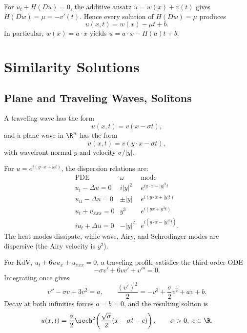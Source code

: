 \begin{example}
\label{ex:hamilton-jacobi-additive-separation}
For $u_t+H(Du)=0$, the additive ansatz $u=w(x)+v(t)$ gives
$H(Dw)=\mu=-v'(t)$. Hence every solution of $H(Dw)=\mu$ produces
\[
u(x,t)=w(x)-\mu t+b.
\]
In particular, $w(x)=a\cdot x$ yields $u=a\cdot x-H(a)t+b$.
\end{example}

\section{Similarity Solutions}
\label{sec:similarity-solutions}

\subsection{Plane and Traveling Waves, Solitons}
\label{sec:plane-traveling-waves-solitons}

\begin{definition}
\label{def:traveling-wave-plane-wave}
A traveling wave has the form
\[
u(x,t)=v(x-\sigma t),
\]
and a plane wave in $\R^n$ has the form
\[
u(x,t)=v(y\cdot x-\sigma t),
\]
with wavefront normal $y$ and velocity $\sigma/|y|$.
\end{definition}

\begin{example}
\label{ex:exponential-plane-wave-solutions}
For $u=e^{i(y\cdot x+\omega t)}$, the dispersion relations are:
\[
\begin{array}{c|c|c}
\text{PDE}&\omega&\text{mode}\\ \hline
u_t-\Delta u=0&i|y|^2&e^{iy\cdot x-|y|^2t}\\
u_{tt}-\Delta u=0&\pm|y|&e^{i(y\cdot x\pm|y|t)}\\
u_t+u_{xxx}=0&y^3&e^{i(yx+y^3t)}\\
iu_t+\Delta u=0&-|y|^2&e^{i(y\cdot x-|y|^2t)}.
\end{array}
\]
The heat modes dissipate, while wave, Airy, and Schrodinger modes are
dispersive (the Airy velocity is $y^2$).
\end{example}

\begin{example}
\label{ex:kdv-soliton-traveling-wave}
For KdV, $u_t+6uu_x+u_{xxx}=0$, a traveling profile satisfies the
third-order ODE
\[
-\sigma v'+6vv'+v'''=0.
\]
Integrating once gives
\[
v''-\sigma v+3v^2=a,\qquad
\frac{(v')^2}{2}=-v^3+\frac\sigma2v^2+av+b.
\]
Decay at both infinities forces $a=b=0$, and the resulting soliton is
\[
u(x,t)=\frac\sigma2\sech^2\!\left(\frac{\sqrt\sigma}{2}(x-\sigma t-c)\right),
\qquad \sigma>0,\ c\in\R.
\]
\end{example}

